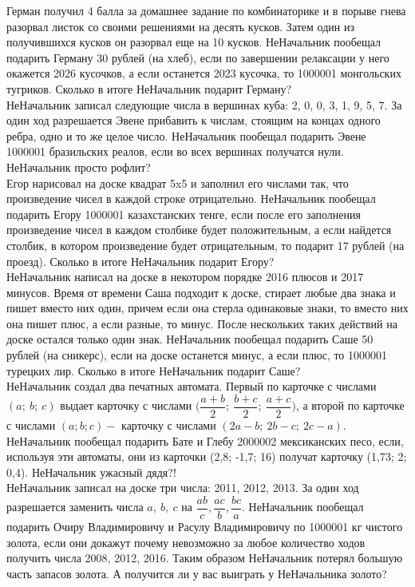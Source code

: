 Герман получил 4 балла за домашнее задание по комбинаторике и в порыве гнева разорвал листок со своими решениями на десять кусков. Затем один из получившихся кусков он разорвал еще на 10 кусков. НеНачальник пообещал подарить Герману 30 рублей (на хлеб), если по завершении релаксации у него окажется 2026 кусочков, а если останется 2023 кусочка, то 1000001 монгольских тугриков. Сколько в итоге НеНачальник подарит Герману?\\

НеНачальник записал следующие числа в вершинах куба: 2, 0, 0, 3, 1, 9, 5, 7. За один ход разрешается Эвене прибавить к числам, стоящим на концах одного ребра, одно и то же целое число. НеНачальник пообещал подарить Эвене 1000001 бразильских реалов, если во всех вершинах получатся нули. НеНачальник просто рофлит? \\

Егор нарисовал на доске квадрат 5x5 и заполнил его числами так, что произведение чисел в каждой строке отрицательно. НеНачальник пообещал подарить Егору 1000001 казахстанских тенге, если после его заполнения произведение чисел в каждом столбике будет положительным, а если найдется столбик, в котором произведение будет отрицательным, то подарит 17 рублей (на проезд). Сколько в итоге НеНачальник подарит Егору?\\

НеНачальник написал на доске в некотором порядке 2016 плюсов и 2017 минусов. Время от времени Саша подходит к доске, стирает любые два знака и пишет вместо них один, причем если она стерла одинаковые знаки, то вместо них она пишет плюс, а если разные, то минус. После нескольких таких действий на доске остался только один знак. НеНачальник пообещал подарить Саше 50 рублей (на сникерс), если на доске останется минус, а если плюс, то 1000001 турецких лир. Сколько в итоге НеНачальник подарит Саше?\\

 НеНачальник создал два печатных автомата. Первый по карточке с числами $(a; \ b; \ c)$ выдает карточку с числами
$\biggl(\dfrac{a+b}{2}; \ \dfrac{b+c}{2}; \ \dfrac{a+c}{2}\biggl)$, а второй по карточке с числами $(a; b; c) -$  карточку с числами $(2a-b; \ 2b-c; \ 2c-a)$. НеНачальник пообещал подарить Бате и Глебу 2000002 мексиканских песо, если, используя эти автоматы, они из карточки (2,8; -1,7; 16) получат карточку (1,73; 2; 0,4). НеНачальник ужасный дядя?!\\


 НеНачальник записал на доске три числа: 2011, 2012, 2013. За один ход разрешается заменить числа $a, \ b, \ c$ на $\dfrac{ab}{c},\dfrac{ac}{b},\dfrac{bc}{a}$. НеНачальник пообещал подарить Очиру Владимировичу и Расулу Владимировичу по 1000001 кг чистого золота, если они докажут почему невозможно за любое количество ходов получить числа 2008, 2012, 2016. Таким образом НеНачальник потерял большую часть запасов золота. А получится ли у вас выиграть у НеНачальника золото?